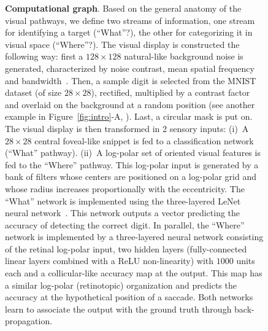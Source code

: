 \begin{figure}[t!]%
	\caption{%
		{\bf Computational graph}. Based on the general anatomy of the visual pathways, we define two streams of information, one stream for identifying a target (``What''?), the other for categorizing it in visual space (``Where''?).
		\A The visual display is constructed the following way: first a $128\times 128$ natural-like background noise is generated, characterized by noise contrast, mean spatial frequency and bandwidth~\cite{Sanz12}. Then, a sample digit is selected from the MNIST dataset (of size $28\times 28$), rectified, multiplied by a contrast factor and overlaid on the background at a random position (see another example in Figure~\ref{fig:intro}-A, \DIS ). Last, a circular mask is put on. %
		\B The visual display is then transformed in 2 sensory inputs: (i)~A $28\times 28$ central foveal-like snippet is fed to a classification network (``What'' pathway). (ii)~A log-polar set of oriented visual features is fed to the ``Where'' pathway. This log-polar input is generated by a bank of filters whose centers are positioned on a log-polar grid and whose radius increases proportionally with the eccentricity. %
		\C The ``What'' network is implemented using the three-layered LeNet neural network~\cite{Lecun1998}. This network outputs a vector predicting the accuracy of detecting the correct digit. In parallel, the ``Where'' network is implemented by a three-layered neural network consisting of the retinal log-polar input, two hidden layers (fully-connected linear layers combined with a ReLU non-linearity) with $1000$ units each and a collicular-like accuracy map at the output. This map has a similar log-polar (retinotopic) organization and predicts the accuracy at the hypothetical position of a saccade. Both networks learn to associate the output with the ground truth through back-propagation.
}
\end{figure}
